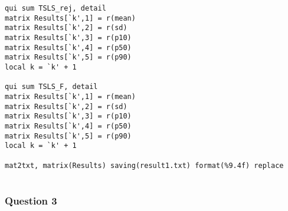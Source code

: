 \documentclass[12pt]{article}
\begin{document}
\begin{verbatim}
qui sum TSLS_rej, detail
matrix Results[`k',1] = r(mean)
matrix Results[`k',2] = r(sd)
matrix Results[`k',3] = r(p10)
matrix Results[`k',4] = r(p50)
matrix Results[`k',5] = r(p90)
local k = `k' + 1

qui sum TSLS_F, detail
matrix Results[`k',1] = r(mean)
matrix Results[`k',2] = r(sd)
matrix Results[`k',3] = r(p10)
matrix Results[`k',4] = r(p50)
matrix Results[`k',5] = r(p90)
local k = `k' + 1

mat2txt, matrix(Results) saving(result1.txt) format(%9.4f) replace


\end{verbatim}

\subsubsection{Question 3}
\end{document}

